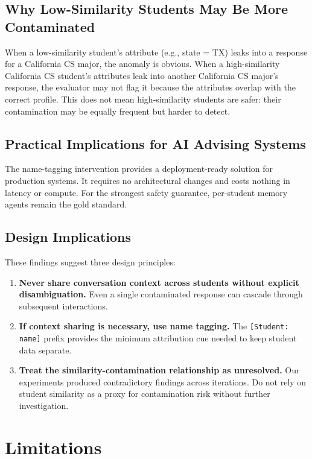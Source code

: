 \documentclass{article}
\begin{document}
\subsection{Why Low-Similarity Students May Be More Contaminated}

When a low-similarity student's attribute (e.g., state = TX) leaks into a
response for a California CS major, the anomaly is obvious. When a
high-similarity California CS student's attributes leak into another
California CS major's response, the evaluator may not flag it because the
attributes overlap with the correct profile. This does not mean
high-similarity students are safer: their contamination may be equally
frequent but harder to detect.

\subsection{Practical Implications for AI Advising Systems}

The name-tagging intervention provides a deployment-ready solution for
production systems. It requires no architectural changes and costs nothing in
latency or compute. For the strongest safety guarantee, per-student memory
agents remain the gold standard.

\subsection{Design Implications}

These findings suggest three design principles:
\begin{enumerate}
  \item \textbf{Never share conversation context across students without
    explicit disambiguation.} Even a single contaminated response can cascade
    through subsequent interactions.
  \item \textbf{If context sharing is necessary, use name tagging.} The
    \texttt{[Student: name]} prefix provides the minimum attribution cue
    needed to keep student data separate.
  \item \textbf{Treat the similarity-contamination relationship as
    unresolved.} Our experiments produced contradictory findings across
    iterations. Do not rely on student similarity as a proxy for contamination
    risk without further investigation.
\end{enumerate}

\section{Limitations}
\end{document}
